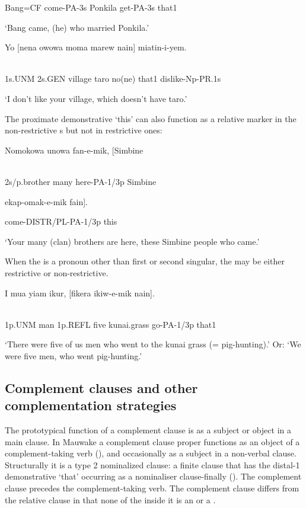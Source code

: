Bang=CF  come-PA-3s  Ponkila  get-PA-3s  that1

`Bang came, (he) who married Ponkila.'

\ea%
\label{ex:x1568}
\gll Yo  [nena  owowa  moma  marew  nain]  miatin-i-yem. \\
      \\
\glt
\z

1s.UNM  2s.GEN  village  taro  no(ne)  that1  dislike-Np-PR.1s

`I don't like your village, which doesn't have taro.'

The proximate demonstrative  `this' can also function as a relative marker in the non-restrictive s but not in restrictive ones:

\ea%
\label{ex:x1536}
\gll Nomokowa  unowa  fan-e-mik,  [Simbine \\
      \\
\glt
\z

2s/p.brother  many  here-PA-1/3p  Simbine

ekap-omak-e-mik  fain].

come-DISTR/PL-PA-1/3p  this

`Your many (clan) brothers are here, these Simbine people who came.'

When the  is a pronoun other than first or second singular, the  may be either restrictive or non-restrictive.

\ea%
\label{ex:x1570}
\gll I  mua  yiam  ikur,  [fikera  ikiw-e-mik  nain]. \\
      \\
\glt
\z

1p.UNM  man  1p.REFL  five  kunai.grass  go-PA-1/3p  that1

`There were five of us men who went to the kunai grass (= pig-hunting).' Or: `We were five men, who went pig-hunting.'

\subsection{Complement clauses and other complementation strategies}
\hypertarget{RefHeading23401935131865}{}
The prototypical function of a complement clause is as a subject or object in a main clause. In Mauwake a complement clause proper functions as an object of a complement-taking verb (), and occasionally as a subject in a non-verbal clause. Structurally it is a type 2 nominalized clause: a finite clause that has the distal-1 demonstrative  `that' occurring as a nominaliser clause-finally (). The complement clause precedes the complement-taking verb. The complement clause differs from the relative clause in that none of the  inside it is an  or a . 

